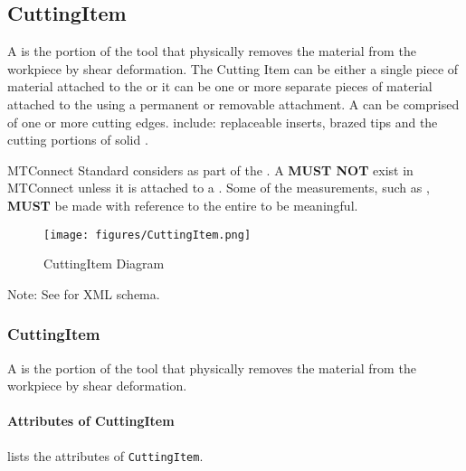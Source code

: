 \subsection{CuttingItem} \label{sec:CuttingItem}


A  is the portion of the tool that physically removes the material from the workpiece by shear deformation.  The Cutting Item can be either a single piece of material attached to the  or it can be one or more separate pieces of material attached to the  using a permanent or removable attachment.  A  can be comprised of one or more cutting edges.  include: replaceable inserts, brazed tips and the cutting portions of solid .

MTConnect Standard considers  as part of the .  A  \textbf{MUST NOT} exist in MTConnect unless it is attached to a .  Some of the measurements, such as , \textbf{MUST} be made with reference to the entire  to be meaningful.

\begin{figure}[ht]
  \centering
    \texttt{[image: figures/CuttingItem.png]}
  \caption{CuttingItem Diagram}
  \label{fig:CuttingItem Diagram}
\end{figure}

\FloatBarrier


Note: See  for XML schema.


\subsubsection{CuttingItem}




A  is the portion of the tool that physically removes the material from the workpiece by shear deformation.


\paragraph{Attributes of CuttingItem}\mbox{}
\label{sec:Attributes of CuttingItem}

 lists the attributes of \texttt{CuttingItem}.

